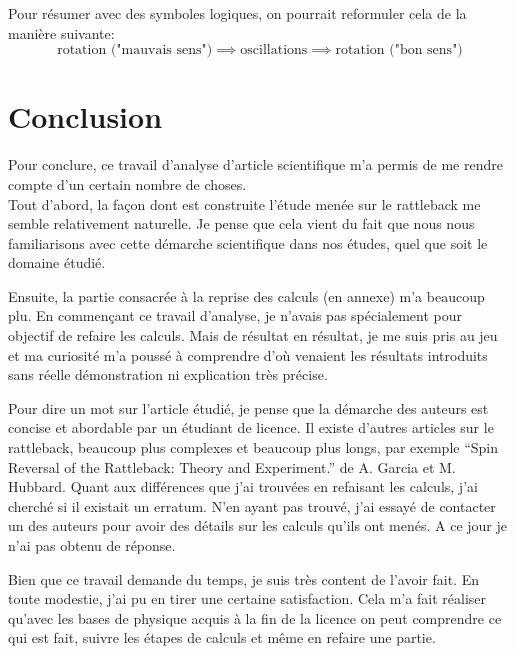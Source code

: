 \documentclass[12pt,a4paper]{article}
\begin{document}
	Pour résumer avec des symboles logiques, on pourrait reformuler cela de la manière suivante:
	$$\text{rotation ("mauvais sens")}\implies\text{oscillations}\implies\text{rotation ("bon sens")}$$
	
	\section{Conclusion}
	Pour conclure, ce travail d'analyse d'article scientifique m'a permis de me rendre compte d'un certain nombre de choses.\\
	
	Tout d'abord, la façon dont est construite l'étude menée sur le rattleback me semble relativement naturelle. Je pense que cela vient du fait que nous nous familiarisons avec cette démarche scientifique dans nos études, quel que soit le domaine étudié. 
	
	Ensuite, la partie consacrée à la reprise des calculs (en annexe) m'a beaucoup plu. En commençant ce travail d'analyse, je n'avais pas spécialement pour objectif de refaire les calculs. Mais de résultat en résultat, je me suis pris au jeu et ma curiosité m'a poussé à comprendre d'où venaient les résultats introduits sans réelle démonstration ni explication très précise.
	
	Pour dire un mot sur l'article étudié, je pense que la démarche des auteurs est concise et abordable par un étudiant de licence. Il existe d'autres articles sur le rattleback, beaucoup plus complexes et beaucoup plus longs, par exemple “Spin Reversal of the Rattleback: Theory and Experiment.” de A. Garcia et M. Hubbard. Quant aux différences que j'ai trouvées en refaisant les calculs, j'ai cherché si il existait un erratum. N'en ayant pas trouvé, j'ai essayé de contacter un des auteurs pour avoir des détails sur les calculs qu'ils ont menés. A ce jour je n'ai pas obtenu de réponse.
	
	Bien que ce travail demande du temps, je suis très content de l'avoir fait. En toute modestie, j'ai pu en tirer une certaine satisfaction. Cela m'a fait réaliser qu'avec les bases de physique acquis à la fin de la licence on peut comprendre ce qui est fait, suivre les étapes de calculs et même en refaire une partie.
\end{document}
